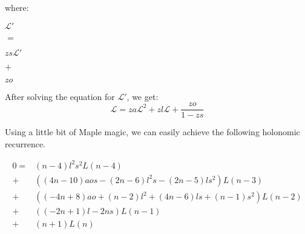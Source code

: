 \documentclass[final]{article}
\theoremstyle{definition}
\theoremstyle{remark}
\newcommand{\gf}[1]{\ensuremath{\mathcal{#1}}}
\begin{document}
where:

\begin{center}
    \begin{minipage}[t]{.2\textwidth}
        \begin{center}
            \(\gf{L'}\)\\
        \end{center}
    \end{minipage}%
    \begin{minipage}[t]{.05\textwidth}
        \begin{center}
            \(=\)\\
        \end{center}
    \end{minipage}%
    \begin{minipage}[t]{.2\textwidth}
        \begin{center}
            \(z s \gf{L'}\)\\
        \end{center}
    \end{minipage}%
    \begin{minipage}[t]{.05\textwidth}
        \begin{center}
            \(+\)\\
        \end{center}
    \end{minipage}%
    \begin{minipage}[t]{.2\textwidth}
        \begin{center}
            \(z o\)\\
        \end{center}
    \end{minipage}%
\end{center}

After solving the equation for \(\gf{L'}\), we get:
\[\gf{L} = z a \gf{L}^2 + z l \gf{L} + \frac{z o}{1 - z s}\]

Using a little bit of Maple magic\cite{gfun}, we can easily achieve the following holonomic recurrence.

\[\begin{array}{rl}
        0 =& (n - 4) l^2 s^2 L(n - 4)\\
        +& ((4 n - 10) a o s - (2 n - 6) l^2 s - (2 n - 5) l s^2) L(n - 3)\\
        +& ((-4 n + 8) a o + (n - 2) l^2 + (4 n - 6) l s + (n - 1) s^2) L(n - 2)\\
        +& ((-2 n + 1) l - 2 n s) L(n - 1)\\
        +& (n + 1) L(n)
\end{array}\]
\end{document}
